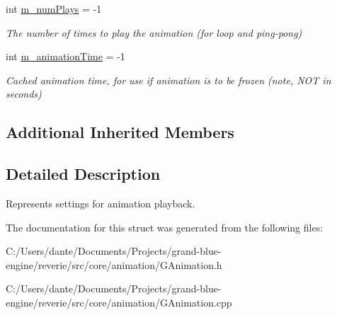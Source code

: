\begin{DoxyCompactItemize}
int \mbox{\hyperlink{structrev_1_1_animation_settings_a1b221d0d02069dc93448b625435fd21d}{m\+\_\+num\+Plays}} = -\/1
\begin{DoxyCompactList}\small\item\em The number of times to play the animation (for loop and ping-\/pong) \end{DoxyCompactList}\item 
\mbox{\label{structrev_1_1_animation_settings_ac2c405457970fc0ef9ceb51a174d1ca6}} 
int \mbox{\hyperlink{structrev_1_1_animation_settings_ac2c405457970fc0ef9ceb51a174d1ca6}{m\+\_\+animation\+Time}} = -\/1
\begin{DoxyCompactList}\small\item\em Cached animation time, for use if animation is to be frozen (note, N\+OT in seconds) \end{DoxyCompactList}\end{DoxyCompactItemize}
\subsection*{Additional Inherited Members}


\subsection{Detailed Description}
Represents settings for animation playback. 

The documentation for this struct was generated from the following files\+:\begin{DoxyCompactItemize}
\item 
C\+:/\+Users/dante/\+Documents/\+Projects/grand-\/blue-\/engine/reverie/src/core/animation/G\+Animation.\+h\item 
C\+:/\+Users/dante/\+Documents/\+Projects/grand-\/blue-\/engine/reverie/src/core/animation/G\+Animation.\+cpp\end{DoxyCompactItemize}
